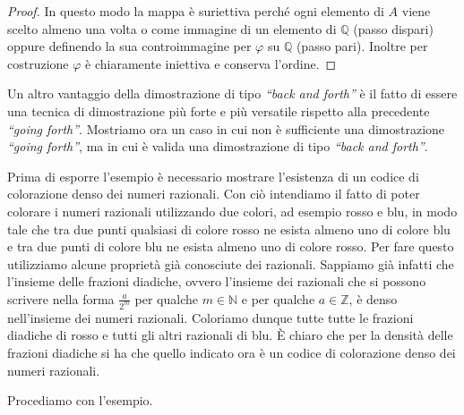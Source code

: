 \documentclass[12pt,a4paper,openright]{report}
\newcommand{\N}{\mathbb{N}} %
\newcommand{\Q}{\mathbb{Q}} %
\newcommand{\0}{\setminus\{0\}} %
\theoremstyle{definition}
\theoremstyle{plain}
\begin{document}
\begin{proof}
In questo modo la mappa è suriettiva perché ogni elemento di $A$ viene scelto almeno una volta o come immagine di un elemento di $\Q$ (passo dispari) oppure definendo la sua controimmagine per $\varphi$ su $\Q$ (passo pari). Inoltre per costruzione $\varphi$ è chiaramente iniettiva e conserva l'ordine.
\end{proof}

Un altro vantaggio della dimostrazione di tipo \emph{``back and forth''} è il fatto di essere una tecnica di dimostrazione più forte e più versatile rispetto alla precedente \emph{``going forth''}. Mostriamo ora un caso in cui non è sufficiente una dimostrazione \emph{``going forth''}, ma in cui è valida una dimostrazione di tipo \emph{``back and forth''}.

Prima di esporre l'esempio è necessario mostrare l'esistenza di un codice di colorazione denso dei numeri razionali. Con ciò intendiamo il fatto di poter colorare i numeri razionali utilizzando due colori, ad esempio rosso e blu, in modo tale che tra due punti qualsiasi di colore rosso ne esista almeno uno di colore blu e tra due punti di colore blu ne esista almeno uno di colore rosso. Per fare questo utilizziamo alcune proprietà già conosciute dei razionali. Sappiamo già infatti che l'insieme delle frazioni diadiche, ovvero l'insieme dei razionali che si possono scrivere nella forma $\frac{a}{2^m}$ per qualche $m \in \N$ e per qualche $a \in \mathbb{Z}$, è denso nell'insieme dei numeri razionali. Coloriamo dunque tutte tutte le frazioni diadiche di rosso e tutti gli altri razionali di blu. È chiaro che per la densità delle frazioni diadiche si ha che quello indicato ora è un codice di colorazione denso dei numeri razionali.

Procediamo con l'esempio.
\end{document}
